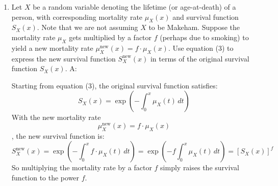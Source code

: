 \documentclass{article}
\begin{document}
\begin{enumerate}
\begin{verbatim}
Output:
> makeham_cond
[1] 10.94129
\end{verbatim}

(c) You should see that the Makeham estimate in part (b) of the expected number of pension years for people surviving up to age 65 is quite close to the corresponding sample estimate in (a), even though the Makeham estimate in Q5 of the expected number of pension years for everybody was higher than the corresponding sample estimate. Can you explain why this is the case?
\newline \newline A:
When computing $\mathbb{E}[(X-65)_+]$ for the whole population, the comparison includes everyone.
The Makeham model ignores those early deaths and thus overestimates the probability of surviving to old age for the full cohort, causing it to give a higher value than the sample.
However, when we condition on $X>65$, we restrict attention to people who actually survived past 65. 
At this point, the infant deaths are already "filtered" out of both the sample and the model.


\newpage
\section{Proportional hazard models}

It is sometimes claimed that because of smoking, mortality rates are multiplied by a certain factor, let's say, doubled. We want to investigate what effect doubling the mortality rate has on the life expectancy.

\item[$\boldsymbol{Q_7}$] Let $X$ be a random variable denoting the lifetime (or age-at-death) of a person, with corresponding mortality rate $\mu_X(x)$ and survival function $S_X(x)$. Note that we are not assuming $X$ to be Makeham. Suppose the mortality rate $\mu_X$ gets multiplied by a factor $f$ (perhaps due to smoking) to yield a new mortality rate $\mu_X^{\text{new}}(x) = f \cdot \mu_X(x)$. Use equation (3) to express the new survival function $S_X^{\text{new}}(x)$ in terms of the original survival function $S_X(x)$.
\newline \newline A:

Starting from equation (3), the original survival function satisfies:
\[S_X(x) = \exp\!\left(-\int_0^x \mu_X(t)\,dt\right)\]
With the new mortality rate \[ \mu_X^{\text{new}}(x) = f \cdot \mu_X(x)\], 
the new survival function is:
\[S_X^{\text{new}}(x) = \exp\!\left(-\int_0^x f\cdot\mu_X(t)\,dt\right) = \exp\!\left(-f\int_0^x \mu_X(t)\,dt\right) = \left[S_X(x)\right]^f\]
So multiplying the mortality rate by a factor $f$ simply raises the survival function to the power $f$.




\end{enumerate}
\end{document}
